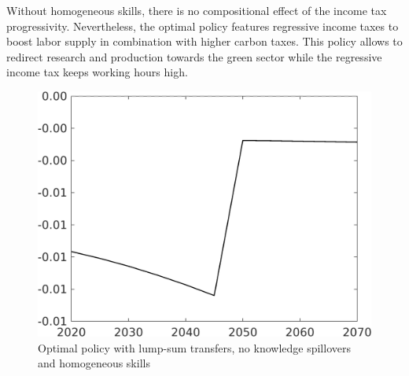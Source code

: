 Without homogeneous skills, there is no compositional effect of the income tax progressivity. Nevertheless, the optimal policy features regressive income taxes to boost labor supply in combination with higher carbon taxes. This policy allows to redirect research and production towards the green sector while the regressive income tax keeps working hours high. %

\begin{figure}[h!!!]
	\centering
	\caption{Optimal policy with lump-sum transfers, no knowledge spillovers and homogeneous skills }\label{fig:opt_TLs_noknow_homoskill}
	\begin{minipage}[]{0.32\textwidth}
		\includegraphics[width=1\textwidth]{../../codding_model/own_basedOnFried/optimalPol_010922_revision/figures/all_13Sept22_Tplus30/taul_OPT_COMPtaul_regime4_spillover0_knspil1_noskill1_sep0_xgrowth0_PV1_etaa0.79_lgd0.png}
	\end{minipage}
	\begin{minipage}[]{0.32\textwidth}

\end{minipage}
\end{figure}
